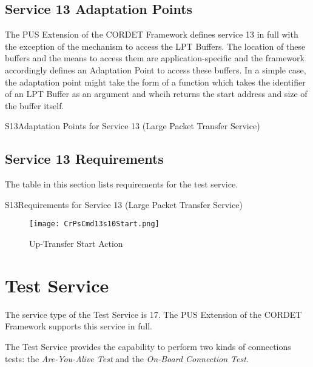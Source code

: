 \documentclass{pnp_article}
\begin{document}
\newpage
\subsection{Service 13 Adaptation Points}
The PUS Extension of the CORDET Framework defines service 13 in full with the exception of the mechanism to access the LPT Buffers. The location of these buffers and the means to access them are application-specific and the framework accordingly defines an Adaptation Point to access these buffers. In a simple case, the adaptation point might take the form of a function which takes the identifier of an LPT Buffer as an argument and whcih returns the start address and size of the buffer itself.

\begin{crAp}{S13}{Adaptation Points for Service 13 (Large Packet Transfer Service)}
\end{crAp}


\newpage
\subsection{Service 13 Requirements}
The table in this section lists requirements for the test service.

\begin{crReq}{S13}{Requirements for Service 13 (Large Packet Transfer Service)}
\end{crReq}

\begin{figure}[H]
 \centering
 \texttt{[image: CrPsCmd13s10Start.png]}
 \caption{Up-Transfer Start Action}
 \label{fig:Cmd13s10Start}
\end{figure}




\section{Test Service}\label{sec:serv17}
The service type of the Test Service is 17. The PUS Extension of the CORDET Framework supports this service in full.

The Test Service provides the capability to perform two kinds of connections tests: the \textit{Are-You-Alive Test} and the \textit{On-Board Connection Test}.
\end{document}
